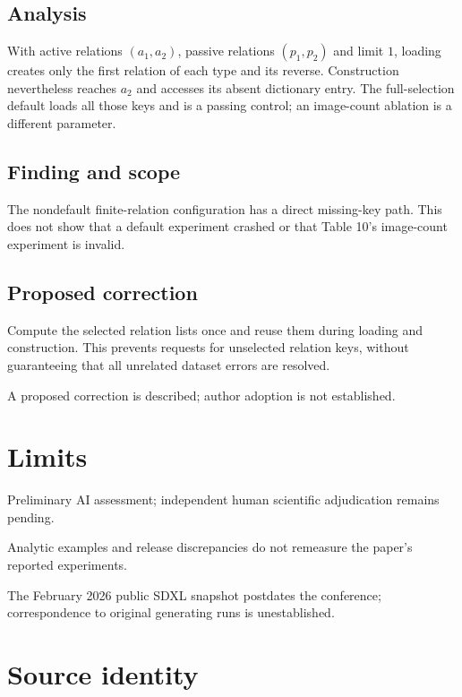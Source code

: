 \documentclass[11pt]{article}
\begin{document}
\subsection*{Analysis}

With active relations \((a_1,a_2)\), passive relations \((p_1,p_2)\) and limit \(1\), loading creates only the first relation of each type and its reverse. Construction nevertheless reaches \(a_2\) and accesses its absent dictionary entry. The full-selection default loads all those keys and is a passing control; an image-count ablation is a different parameter.

\subsection*{Finding and scope}

The nondefault finite-relation configuration has a direct missing-key path. This does not show that a default experiment crashed or that Table 10’s image-count experiment is invalid.

\subsection*{Proposed correction}

Compute the selected relation lists once and reuse them during loading and construction. This prevents requests for unselected relation keys, without guaranteeing that all unrelated dataset errors are resolved.

A proposed correction is described; author adoption is not established.

\section*{Limits}

Preliminary AI assessment; independent human scientific adjudication remains pending.\par

Analytic examples and release discrepancies do not remeasure the paper’s reported experiments.\par

The February 2026 public SDXL snapshot postdates the conference; correspondence to original generating runs is unestablished.\par

\section*{Source identity}
\end{document}
